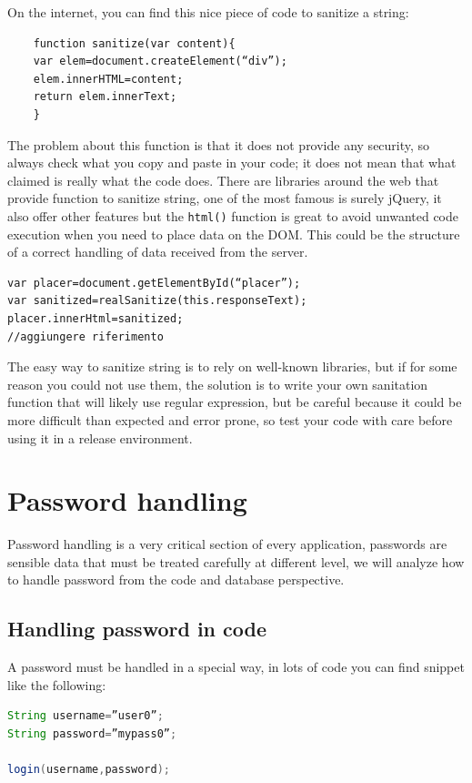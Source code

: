 On the internet, you can find this nice piece of code to sanitize a string:
\begin{lstlisting}
	function sanitize(var content){
	var elem=document.createElement(“div”);
	elem.innerHTML=content;
	return elem.innerText;
	}
\end{lstlisting}


The problem about this function is that it does not provide any security, so always check what you copy and paste in your code; it does not mean that what claimed is really what the code does.\newline
There are libraries around the web that provide function to sanitize string, one of the most famous is surely jQuery, it also offer other features but the \texttt{html()} function is great to avoid unwanted code execution when you need to place data on the DOM.\newline
This could be the structure of a correct handling of data received from the server.\newline
\begin{lstlisting}
var placer=document.getElementById(“placer”);
var sanitized=realSanitize(this.responseText);
placer.innerHtml=sanitized;
//aggiungere riferimento
\end{lstlisting}
The easy way to sanitize string is to rely on well-known libraries, but if for some reason you could not use them, the solution is to write your own sanitation function that will likely use regular expression, but be careful because it could be more difficult than expected and error prone, so test your code with care before using it in a release environment.\newline

\section{Password handling}
Password handling is a very critical section of every application, passwords are sensible data that must be treated carefully at different level, we will analyze how to handle password from the code and database perspective.\newline

\subsection{Handling password in code}
A password must be handled in a special way, in lots of code you can find snippet like the following:
\begin{lstlisting}[language=java]
String username=”user0”;
String password=”mypass0”;

login(username,password);
\end{lstlisting}

